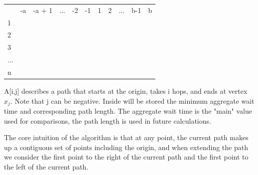 \documentclass[a4paper]{article}
\begin{document}
\begin{table}[htb]
\centering
\begin{tabular}{lllllllllll}
                         & -a                    & -a + 1                & ...                   & -2                    & -1                    & 1                     & 2                     & ...                   & b-1                   & b                     \\ \cline{2-11} 
\multicolumn{1}{l|}{1}   & \multicolumn{1}{l|}{} & \multicolumn{1}{l|}{} & \multicolumn{1}{l|}{} & \multicolumn{1}{l|}{} & \multicolumn{1}{l|}{} & \multicolumn{1}{l|}{} & \multicolumn{1}{l|}{} & \multicolumn{1}{l|}{} & \multicolumn{1}{l|}{} & \multicolumn{1}{l|}{} \\ \cline{2-11} 
\multicolumn{1}{l|}{2}   & \multicolumn{1}{l|}{} & \multicolumn{1}{l|}{} & \multicolumn{1}{l|}{} & \multicolumn{1}{l|}{} & \multicolumn{1}{l|}{} & \multicolumn{1}{l|}{} & \multicolumn{1}{l|}{} & \multicolumn{1}{l|}{} & \multicolumn{1}{l|}{} & \multicolumn{1}{l|}{} \\ \cline{2-11} 
\multicolumn{1}{l|}{3}   & \multicolumn{1}{l|}{} & \multicolumn{1}{l|}{} & \multicolumn{1}{l|}{} & \multicolumn{1}{l|}{} & \multicolumn{1}{l|}{} & \multicolumn{1}{l|}{} & \multicolumn{1}{l|}{} & \multicolumn{1}{l|}{} & \multicolumn{1}{l|}{} & \multicolumn{1}{l|}{} \\ \cline{2-11} 
\multicolumn{1}{l|}{...} & \multicolumn{1}{l|}{} & \multicolumn{1}{l|}{} & \multicolumn{1}{l|}{} & \multicolumn{1}{l|}{} & \multicolumn{1}{l|}{} & \multicolumn{1}{l|}{} & \multicolumn{1}{l|}{} & \multicolumn{1}{l|}{} & \multicolumn{1}{l|}{} & \multicolumn{1}{l|}{} \\ \cline{2-11} 
\multicolumn{1}{l|}{n}   & \multicolumn{1}{l|}{} & \multicolumn{1}{l|}{} & \multicolumn{1}{l|}{} & \multicolumn{1}{l|}{} & \multicolumn{1}{l|}{} & \multicolumn{1}{l|}{} & \multicolumn{1}{l|}{} & \multicolumn{1}{l|}{} & \multicolumn{1}{l|}{} & \multicolumn{1}{l|}{} \\ \cline{2-11} 
\end{tabular}
\end{table}

A[i,j] describes a path that starts at the origin,  takes i hops, and ends at vertex $x_j$. Note that j can be negative. Inside will be stored the minimum aggregate wait time and corresponding path length. The aggregate wait time is the "main" value used for comparisons, the path length is used in future calculations.

The core intuition of the algorithm is that at any point, the current path makes up a contiguous set of points including the origin, and when extending the path we consider the first point to the right of the current path and the first point to the left of the current path.
\end{document}
